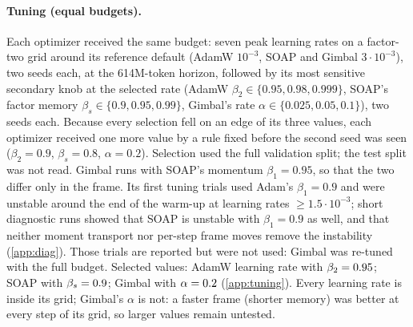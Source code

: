 \paragraph{Tuning (equal budgets).} Each optimizer received the same budget: seven peak learning
rates on a factor-two grid around its reference default (AdamW $10^{-3}$, SOAP and Gimbal
$3\cdot10^{-3}$), two seeds each, at the 614M-token horizon, followed by its most sensitive
secondary knob at the selected rate (AdamW $\beta_2\in\{0.95,0.98,0.999\}$, SOAP's factor memory
$\beta_s\in\{0.9,0.95,0.99\}$, Gimbal's rate $\alpha\in\{0.025,0.05,0.1\}$), two seeds each. Because
every selection fell on an edge of its three values, each optimizer received one more value by a
rule fixed before the second seed was seen ($\beta_2=0.9$, $\beta_s=0.8$, $\alpha=0.2$).
Selection used the full validation split; the test split was not read. Gimbal runs with SOAP's
momentum $\beta_1=0.95$, so that the two differ only in the frame. Its first tuning trials used
Adam's $\beta_1=0.9$ and were unstable around the end of the warm-up at learning rates
$\ge1.5\cdot10^{-3}$; short diagnostic runs showed that SOAP is unstable with $\beta_1=0.9$ as well,
and that neither moment transport nor per-step frame moves remove the instability
(\cref{app:diag}). Those trials are reported but were not used: Gimbal was re-tuned with the full
budget. Selected values:
AdamW learning rate \LrAdamw{} with $\beta_2=0.95$; SOAP \LrSoap{} with $\beta_s=0.9$;
Gimbal \LrGimbal{} with $\alpha=0.2$ (\cref{app:tuning}). Every learning rate is inside its
grid; Gimbal's $\alpha$ is not: a faster frame (shorter memory) was better at every step of its grid,
so larger values remain untested.
